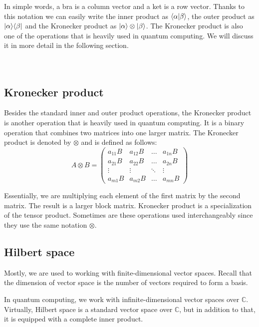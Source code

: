 In simple words, a bra is a column vector and a ket is a row vector. Thanks to this notation we can easily write the inner product as $\langle\alpha\vert\beta\rangle$, the outer product as $\lvert\alpha\rangle\langle\beta\rvert$ and the Kronecker product as $\lvert\alpha\rangle\otimes\lvert\beta\rangle$. The Kronecker product is also one of the operations that is heavily used in quantum computing. We will discuss it in more detail in the following section.
\\ 
\\ 
\\ 
\subsection{Kronecker product}
Besides the standard inner and outer product operations, the Kronecker product is another operation that is heavily used in quantum computing. It is a binary operation that combines two matrices into one larger matrix. The Kronecker product is denoted by $\otimes$ and is defined as follows:
$$A \otimes B = \begin{pmatrix}
    a_{11}B & a_{12}B & \hdots & a_{1n}B \\
    a_{21}B & a_{22}B & \hdots & a_{2n}B \\
    \vdots & \vdots & \ddots & \vdots \\
    a_{m1}B & a_{m2}B & \hdots & a_{mn}B
\end{pmatrix}$$

Essentially, we are multiplying each element of the first matrix by the second matrix. The result is a larger block matrix. Kronecker product is a specialization of the tensor product. Sometimes are these operations used interchangeably since they use the same notation $\otimes$.

\subsection{Hilbert space}
Mostly, we are used to working with finite-dimensional vector spaces. Recall that the dimension of vector space is the number of vectors required to form a basis.

In quantum computing, we work with infinite-dimensional vector spaces over $\mathbb{C}$. Virtually, Hilbert space is a standard vector space over $\mathbb{C}$, but in addition to that, it is equipped with a complete inner product.

